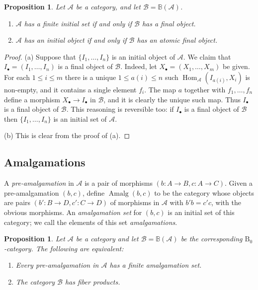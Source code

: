 \documentclass[12pt]{amsart}
\numberwithin{equation}{section}
\newtheorem{proposition}[equation]{Proposition}
\theoremstyle{definition}
\newcommand{\cA}{\mathcal{A}}
\newcommand{\cB}{\mathcal{B}}
\newcommand{\rB}{\mathrm{B}}
\newcommand{\defn}[1]{\emph{#1}}
\newcommand{\BB}{\mathbb{B}}
\DeclareMathOperator{\Hom}{Hom}
\DeclareMathOperator{\Amalg}{Amalg}
\begin{document}
\begin{proposition} \label{prop:initial}
Let $\cA$ be a category, and let $\cB=\BB(\cA)$.
\begin{enumerate}
\item $\cA$ has a finite initial set if and only if $\cB$ has a final object.
\item $\cA$ has an initial object if and only if $\cB$ has an atomic final object.
\end{enumerate}
\end{proposition}

\begin{proof}
(a) Suppose that $\{I_1, \ldots, I_n\}$ is an initial object of $\cA$. We claim that $I_{\bullet}=(I_1, \ldots, I_n)$ is a final object of $\cB$. Indeed, let $X_{\bullet}=(X_1, \ldots, X_m)$ be given. For each $1 \le i \le m$ there is a unique $1 \le a(i) \le n$ such $\Hom_{\cA}(I_{a(i)}, X_i)$ is non-empty, and it contains a single element $f_i$. The map $a$ together with $f_1, \ldots, f_n$ define a morphism $X_{\bullet} \to I_{\bullet}$ in $\cB$, and it is clearly the unique such map. Thus $I_{\bullet}$ is a final object of $\cB$. This reasoning is reversible too: if $I_{\bullet}$ is a final object of $\cB$ then $\{I_1, \ldots, I_n\}$ is an initial set of $\cA$.

(b) This is clear from the proof of (a).
\end{proof}

\subsection{Amalgamations} \label{ss:amalg}

A \defn{pre-amalgamation} in $\cA$ is a pair of morphisms $(b \colon A \to B, c \colon A \to C)$. Given a pre-amalgamation $(b,c)$, define $\Amalg(b,c)$ to be the category whose objects are pairs $(b' \colon B \to D, c' \colon C \to D)$ of morphisms in $\cA$ with $b'b=c'c$, with the obvious morphisms. An \defn{amalgamation set} for $(b,c)$ is an initial set of this category; we call the elements of this set \defn{amalgamations}.

\begin{proposition} \label{prop:amalg}
Let $\cA$ be a category and let $\cB=\BB(\cA)$ be the corresponding $\rB_0$-category. The following are equivalent:
\begin{enumerate}
\item Every pre-amalgamation in $\cA$ has a finite amalgamation set.
\item The category $\cB$ has fiber products.
\end{enumerate}
\end{proposition}
\end{document}
